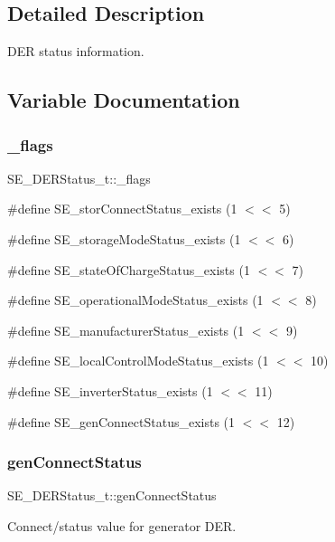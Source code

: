 \subsection{Detailed Description}
D\+ER status information. 

\subsection{Variable Documentation}
\mbox{\label{group__DERStatus_gab4c1e1321c0115d4bf5b67665d12f296}} 
\subsubsection{\texorpdfstring{\+\_\+flags}{\_flags}}
{\footnotesize\ttfamily S\+E\+\_\+\+D\+E\+R\+Status\+\_\+t\+::\+\_\+flags}

\#define S\+E\+\_\+stor\+Connect\+Status\+\_\+exists (1 $<$$<$ 5)

\#define S\+E\+\_\+storage\+Mode\+Status\+\_\+exists (1 $<$$<$ 6)

\#define S\+E\+\_\+state\+Of\+Charge\+Status\+\_\+exists (1 $<$$<$ 7)

\#define S\+E\+\_\+operational\+Mode\+Status\+\_\+exists (1 $<$$<$ 8)

\#define S\+E\+\_\+manufacturer\+Status\+\_\+exists (1 $<$$<$ 9)

\#define S\+E\+\_\+local\+Control\+Mode\+Status\+\_\+exists (1 $<$$<$ 10)

\#define S\+E\+\_\+inverter\+Status\+\_\+exists (1 $<$$<$ 11)

\#define S\+E\+\_\+gen\+Connect\+Status\+\_\+exists (1 $<$$<$ 12) \mbox{\label{group__DERStatus_ga9e187f594a02795f7901a8536eaf93fd}} 
\subsubsection{\texorpdfstring{gen\+Connect\+Status}{genConnectStatus}}
{\footnotesize\ttfamily S\+E\+\_\+\+D\+E\+R\+Status\+\_\+t\+::gen\+Connect\+Status}

Connect/status value for generator D\+ER.


